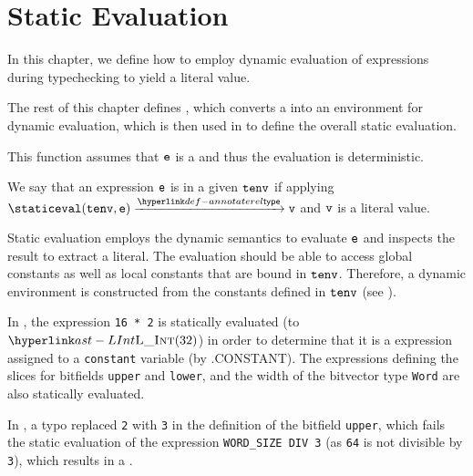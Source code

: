 \chapter{Static Evaluation\label{chap:StaticEvaluation}}

In this chapter, we define how to employ dynamic evaluation of expressions
during typechecking to yield a literal value.

The rest of this chapter defines ,
which converts a \staticenvironmentterm{} into an environment for dynamic evaluation,
which is then used in  to define the overall static evaluation.


This function assumes that $\texttt{e}$ is a \pureterm{} and thus the evaluation is deterministic.

\hypertarget{def-staticallyevaluable}{}
We say that an expression $\texttt{e}$ is \staticallyevaluableterm{} in a given \staticenvironmentterm{} $\texttt{tenv}$ if
applying $\staticeval(\tenv, \ve) \typearrow \vv$ and $\texttt{v}$ is a literal value.

Static evaluation employs the dynamic semantics to evaluate $\texttt{e}$ and inspects the result to extract
a literal. The evaluation should be able to access global constants as well as local constants that
are bound in $\texttt{tenv}$. Therefore, a dynamic environment is constructed from the constants defined in $\texttt{tenv}$
(see ).

In , the expression \verb|16 * 2| is statically evaluated
(to $\LInt(32)$) in order to determine that it is a \staticallyevaluableterm{} expression
assigned to a \verb|constant| variable (by .CONSTANT).
The expressions defining the slices for bitfields \verb|upper| and \verb|lower|,
and the width of the bitvector type \verb|Word| are also statically evaluated.

In , a typo replaced \verb|2| with \verb|3| in the definition
of the bitfield \verb|upper|, which fails the static evaluation of the expression \verb|WORD_SIZE DIV 3|
(as \verb|64| is not divisible by \verb|3|), which results in a \typingerrorterm.


